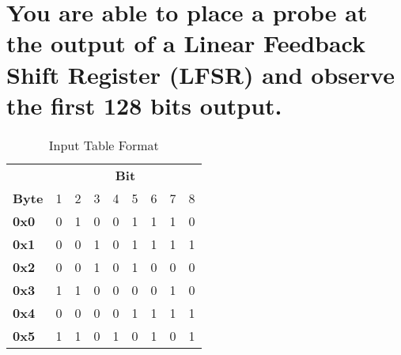 \documentclass{article}
\begin{document}
\section*{You are able to place a probe at the output of a Linear Feedback Shift Register (LFSR) and observe the first 128 bits output.}


\begin{table}[H]
\centering
\caption{Input Table Format}
\begin{tabular}{lcccccccc}
                                  & \multicolumn{8}{c}{\textbf{Bit}}                                                                                                                                                                      \\
\textbf{Byte}                     & \multicolumn{1}{l}{1}  & \multicolumn{1}{l}{2}  & \multicolumn{1}{l}{3}  & \multicolumn{1}{l}{4}  & \multicolumn{1}{l}{5}  & \multicolumn{1}{l}{6}  & \multicolumn{1}{l}{7}  & \multicolumn{1}{l}{8}  \\ \cline{2-9} 
\multicolumn{1}{l|}{\textbf{0x0}} & \multicolumn{1}{c|}{0} & \multicolumn{1}{c|}{1} & \multicolumn{1}{c|}{0} & \multicolumn{1}{c|}{0} & \multicolumn{1}{c|}{1} & \multicolumn{1}{c|}{1} & \multicolumn{1}{c|}{1} & \multicolumn{1}{c|}{0} \\ \cline{2-9} 
\multicolumn{1}{l|}{\textbf{0x1}} & \multicolumn{1}{c|}{0} & \multicolumn{1}{c|}{0} & \multicolumn{1}{c|}{1} & \multicolumn{1}{c|}{0} & \multicolumn{1}{c|}{1} & \multicolumn{1}{c|}{1} & \multicolumn{1}{c|}{1} & \multicolumn{1}{c|}{1} \\ \cline{2-9} 
\multicolumn{1}{l|}{\textbf{0x2}} & \multicolumn{1}{c|}{0} & \multicolumn{1}{c|}{0} & \multicolumn{1}{c|}{1} & \multicolumn{1}{c|}{0} & \multicolumn{1}{c|}{1} & \multicolumn{1}{c|}{0} & \multicolumn{1}{c|}{0} & \multicolumn{1}{c|}{0} \\ \cline{2-9} 
\multicolumn{1}{l|}{\textbf{0x3}} & \multicolumn{1}{c|}{1} & \multicolumn{1}{c|}{1} & \multicolumn{1}{c|}{0} & \multicolumn{1}{c|}{0} & \multicolumn{1}{c|}{0} & \multicolumn{1}{c|}{0} & \multicolumn{1}{c|}{1} & \multicolumn{1}{c|}{0} \\ \cline{2-9} 
\multicolumn{1}{l|}{\textbf{0x4}} & \multicolumn{1}{c|}{0} & \multicolumn{1}{c|}{0} & \multicolumn{1}{c|}{0} & \multicolumn{1}{c|}{0} & \multicolumn{1}{c|}{1} & \multicolumn{1}{c|}{1} & \multicolumn{1}{c|}{1} & \multicolumn{1}{c|}{1} \\ \cline{2-9} 
\multicolumn{1}{l|}{\textbf{0x5}} & \multicolumn{1}{c|}{1} & \multicolumn{1}{c|}{1} & \multicolumn{1}{c|}{0} & \multicolumn{1}{c|}{1} & \multicolumn{1}{c|}{0} & \multicolumn{1}{c|}{1} & \multicolumn{1}{c|}{0} & \multicolumn{1}{c|}{1} \\ \cline{2-9} 

\end{tabular}
\end{table}
\end{document}
